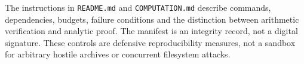 The instructions in \texttt{README.md} and \texttt{COMPUTATION.md} describe commands, dependencies, budgets, failure conditions and the distinction between arithmetic verification and analytic proof. The manifest is an integrity record, not a digital signature. These controls are defensive reproducibility measures, not a sandbox for arbitrary hostile archives or concurrent filesystem attacks.
